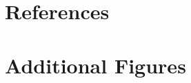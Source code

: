 \documentclass[a4paper]{article}
\makeatletter
\renewcommand{\@seccntformat}[1]{}
\makeatother
\begin{document}

\newpage

\section{References}
\printbibliography[heading=none]

\newpage

\appendix
{}%

\makeatletter
\def\@seccntformat#1{\csname the#1\endcsname\quad}
\makeatother

\renewcommand{\thetable}{\Alph{section}.\arabic{table}}
\renewcommand{\thefigure}{\Alph{section}.\arabic{figure}}

\setcounter{table}{0}
\setcounter{figure}{0}

\section{Additional Figures}
\end{document}
